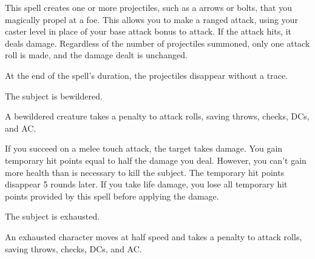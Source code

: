 \spellrng{\rngmed}
\begin{spelleffect}
This spell creates one or more projectiles, such as a arrows or bolts, that you magically propel at a foe. This allows you to make a ranged attack, using your caster level in place of your base attack bonus to attack. If the attack hits, it deals damage. Regardless of the number of projectiles summoned, only one attack roll is made, and the damage dealt is unchanged.
\end{spelleffect}
\begin{spellnotes}
At the end of the spell's duration, the projectiles disappear without a trace.
\end{spellnotes}

\spellrng{\rngclose}
\spelldur{\durshort}
\begin{spellhealthy}
The subject is bewildered.
\end{spellhealthy}
\begin{spellnotes}
A bewildered creature takes a  penalty to attack rolls, saving throws, checks, DCs, and AC.
\end{spellnotes}

\begin{spelleffect}
If you succeed on a melee touch attack, the target takes damage. You gain temporary hit points equal to half the damage you deal. However, you can't gain more health than is necessary to kill the subject. The temporary hit points disappear 5 rounds later. If you take life damage, you lose all temporary hit points provided by this spell before applying the damage.
\end{spelleffect}

\spellrng{\rngmed}
\begin{spelleffect}
The subject is exhausted.
\end{spelleffect}
\begin{spellnotes}
 An exhausted character moves at half speed and takes a  penalty to attack rolls, saving throws, checks, DCs, and AC.
\end{spellnotes}


